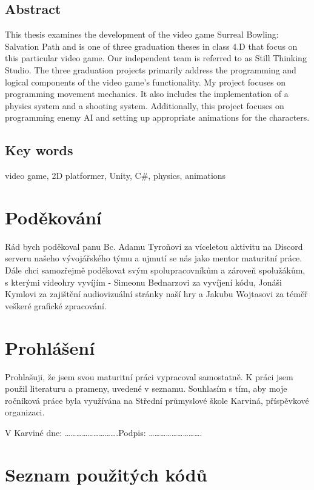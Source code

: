 \documentclass[12pt]{report}
\begin{document}
\section*{Abstract}
This thesis examines the development of the video game Surreal Bowling: Salvation Path and is one of three graduation theses in class 4.D that focus on this particular video game. Our independent team is referred to as Still Thinking Studio. The three graduation projects primarily address the programming and logical components of the video game's functionality. My project focuses on programming movement mechanics. It also includes the implementation of a physics system and a shooting system. Additionally, this project focuses on programming enemy AI and setting up appropriate animations for the characters.

\section*{Key words}
video game, 2D platformer, Unity, C\#, physics, animations

\chapter*{Poděkování}
Rád bych poděkoval panu Bc. Adamu Tyroňovi za víceletou aktivitu na Discord serveru našeho vývojářského týmu a ujmutí se nás jako mentor maturitní práce. Dále chci samozřejmě poděkovat svým spolupracovníkům a zároveň spolužákům, s kterými videohry vyvíjím - Simeonu Bednarzovi za vyvíjení kódu, Jonáši Kymlovi za zajištění audiovizuální stránky naší hry a Jakubu Wojtasovi za téměř veškeré grafické zpracování.


\chapter*{Prohlášení}
Prohlašuji, že jsem svou maturitní práci vypracoval samostatně. K práci jsem použil literaturu a prameny, uvedené v seznamu. Souhlasím s tím, aby moje ročníková práce byla využívána na Střední průmyslové škole Karviná, příspěvkové organizaci.

\vspace{20pt}

\noindent V Karviné dne: ……………………….\hspace{\fill}Podpis: ………………………. 

\tableofcontents








\chapter*{Seznam použitých kódů}
\makeatletter
\def\lstlistoflistings{%
}
\makeatother
\lstlistoflistings

\nocite{*}
\printbibliography[heading=czech bibliography]
\end{document}
